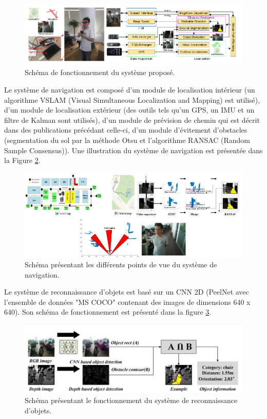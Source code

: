 \documentclass[11pt]{article}
\begin{document}
  \begin{figure}[hbt]  
    \includegraphics[width=\textwidth]{PipelineP1.png}    
    \caption{Schéma de fonctionnement du système proposé.}
    \label{fig:PipelineP1}
  \end{figure} 

  Le système de navigation est composé d'un module de localisation intérieur (un algorithme VSLAM (Visual Simultaneous 
  Localization and Mapping) est utilisé), d'un module de localisation extérieur (des outils tels qu'un GPS, un IMU et un filtre de Kalman 
  sont utilisés), d'un module de prévision de chemin qui est décrit dans des publications précédant celle-ci, d'un module d'évitement 
  d'obstacles (segmentation du sol par la méthode Otsu et l'algorithme RANSAC (Random Sample Consensus)). Une illustration du système de
  navigation est présentée dans la Figure \ref{fig:NavigationP1}.

  \begin{figure}[hbt]  
    \includegraphics[width=\textwidth]{NavigationP1.png}    
    \caption{Schéma présentant les différents points de vue du système de navigation.}
    \label{fig:NavigationP1}
  \end{figure} 

  Le système de reconnaissance d'objets est basé sur un CNN 2D (PeelNet avec l'ensemble de données "MS COCO" contenant des images de dimensions
  640 x 640). Son schéma de fonctionnement est présenté dans la figure \ref{fig:ReconnaissanceP1}.

  \begin{figure}[hbt]  
    \includegraphics[width=\textwidth]{RecognitionP1.png}    
    \caption{Schéma présentant le fonctionnement du système de reconnaissance d'objets.}
    \label{fig:ReconnaissanceP1}
  \end{figure} 
\end{document}

